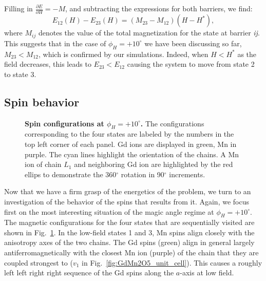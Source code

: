 Filling in $\frac{\partial E}{\partial H} = -M$, and subtracting the expressions for both barriers, we find:
\begin{equation}
	E_{12}(H) - E_{23}(H) = (M_{23} - M_{12})(H - H^*),
\end{equation}
where $M_{ij}$ denotes the value of the total magnetization for the state at barrier {\it ij}.
This suggests that in the case of $\phi_H=+10^\circ$ we have been discussing so far, $M_{23} < M_{12}$, which is confirmed by our simulations.
Indeed, when $H<H^*$ as the field decreases, this leads to $E_{23} < E_{12}$ causing the system to move from state 2 to state 3.

\subsection{Spin behavior}
\begin{figure}[h!]
    \centering
    \caption{\label{fig:GdMn2O5_spin_configs}{\bf Spin configurations at $\phi_H = + 10^\circ$.} The configurations corresponding to the four states are labeled by the numbers in the top left corner of each panel. Gd ions are displayed in green, Mn in purple. The cyan lines highlight the orientation of the chains. A Mn ion of chain $L_1$ and neighboring Gd ion are highlighted by the red ellips to demonstrate the 360$^\circ$ rotation in 90$^\circ$ increments.  }
    \label{fig:GdMn2O5_4configs}
\end{figure}
Now that we have a firm grasp of the energetics of the problem, we turn to an investigation of the behavior of the spins that results from it.
Again, we focus first on the most interesting situation of the magic angle regime at $\phi_H=+10^\circ$.
The magnetic configurations for the four states that are sequentially visited are shown in Fig.~\ref{fig:GdMn2O5_4configs}.
In the low-field states 1 and 3, Mn spins align closely with the anisotropy axes of the two chains.
The Gd spins (green) align in general largely antiferromagnetically with the closest Mn ion (purple) of the chain that they are coupled strongest to ($v_1$ in Fig.~\ref{fig:GdMn2O5_unit_cell}).
This causes a roughly left left right right sequence of the Gd spins along the $a$-axis at low field. 

